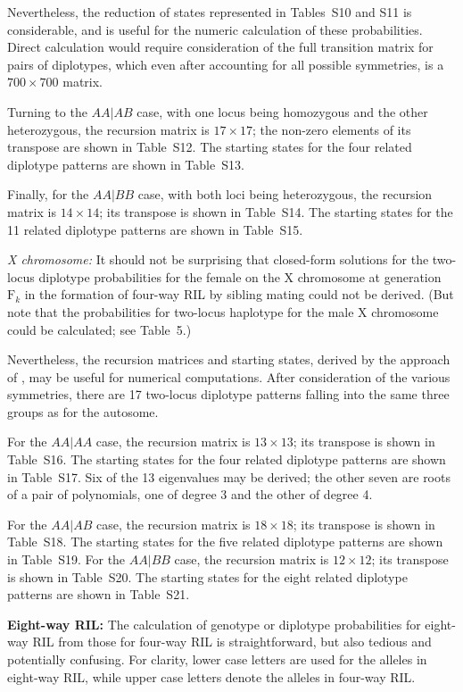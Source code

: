 \documentclass[12pt,letterpaper]{article}
\begin{document}
Nevertheless, the reduction of states represented in Tables~S10 and
S11 is considerable, and is useful for the numeric calculation of
these probabilities.  Direct calculation would require
consideration of the full transition matrix for pairs of diplotypes,
which even after accounting for all possible symmetries, is a $700
\times 700$ matrix.  

Turning to the $AA|AB$ case, with one locus being homozygous and the
other heterozygous, the recursion matrix is $17
\times 17$; the non-zero elements of its transpose
are shown in Table~S12.
The starting states for the four related
diplotype patterns are shown in Table~S13.

Finally, for the $AA|BB$ case, with both loci being heterozygous, the
recursion matrix is $14 \times 14$; its transpose is shown in 
Table~S14.  The starting states for the 11 related diplotype patterns
are shown in Table~S15.  



\emph{X chromosome:}  It should not be surprising that closed-form
solutions for the two-locus diplotype
probabilities for the female on the X chromosome at generation
$\text{F}_k$ in the formation of four-way RIL by sibling mating could
not be derived.
(But
note that the probabilities for two-locus haplotype for the
male X chromosome could be calculated; see Table~5.)

Nevertheless, the recursion matrices and starting states,
derived by the approach of \citet{Kimura1963}, may be useful for
numerical computations.  After consideration of
the various symmetries, there are 17 two-locus diplotype patterns falling
into the same three groups as for the
autosome.  

For the $AA|AA$ case, the recursion matrix is $13 \times 13$; its 
transpose is shown in Table~S16.  The starting states for the
four related diplotype patterns are shown in Table~S17.  
Six of the 13 eigenvalues may be derived; the other seven are roots of a pair
of polynomials, one of degree 3 and the other of degree 4.  

For the $AA|AB$ case, the recursion matrix is $18 \times 18$; its
transpose is shown in Table~S18.  The starting states for
the five related diplotype patterns are shown in Table~S19.  For the
$AA|BB$ case, the recursion matrix is $12 \times 12$; its 
transpose is shown in Table~S20.  The starting states for the
eight related diplotype patterns are shown in Table~S21.



\textbf{Eight-way RIL:} The calculation of genotype or diplotype
probabilities for eight-way RIL from those for four-way RIL is
straightforward, but also tedious and potentially confusing.  For clarity,
lower case letters are used for the alleles in eight-way RIL, while
upper case letters denote the alleles in four-way RIL.
\end{document}
